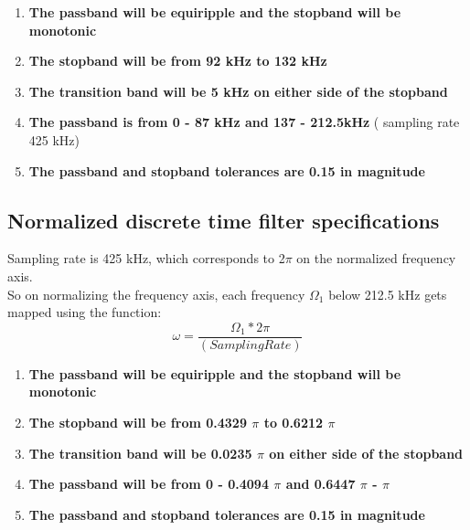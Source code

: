 \documentclass[12pt]{article}
\begin{document}
    \begin{enumerate}
    \item \textbf{The passband will be equiripple and the stopband will be monotonic}
    \item \textbf{The stopband will be from 92 kHz to 132 kHz}
    \item \textbf{The transition band will be 5 kHz on either side of the stopband}
    \item \textbf{The passband is from 0 - 87 kHz and 137 - 212.5kHz} ( sampling rate 425 kHz)
    \item \textbf{The passband and stopband tolerances are 0.15 in magnitude}

\end{enumerate}
\subsection{Normalized discrete time filter specifications}
Sampling rate is 425 kHz, which corresponds to 2$\pi$ on the normalized frequency axis.
\\So on normalizing the frequency axis, each frequency $\Omega_1$ below 212.5 kHz gets mapped using the function:
\begin{equation}
    \omega=\frac{\Omega_1 * 2 \pi}{(Sampling Rate)}
\end{equation}
\begin{enumerate}
    \item \textbf{The passband will be equiripple and the stopband will be monotonic}
    \item \textbf{The stopband will be from 0.4329 $\pi$ to 0.6212 $\pi$}
    \item \textbf{The transition band will be 0.0235 $\pi$ on either side of the stopband}
    \item \textbf{The passband will be from 0 - 0.4094 $\pi$ and 0.6447 $\pi$ - $\pi$} 
    \item \textbf{The passband and stopband tolerances are 0.15 in magnitude}

\end{enumerate}
\newpage
\end{document}
